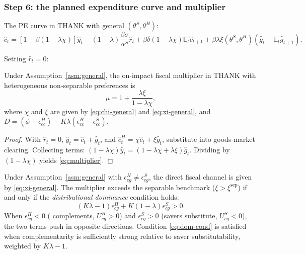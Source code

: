\subsubsection{Step 6: the planned expenditure curve and multiplier}
The PE curve in THANK with general $(\theta^{S},\theta^{H})$:
\begin{equation}\label{eq:PE}
  \hat c_{t}=[1-\beta(1-\lambda\chi)]\hat y_{t}
    -(1-\lambda)\frac{\beta\sigma}{\alpha^{S}}\hat r_{t}
    +\beta\delta(1-\lambda\chi)\mathbb{E}_{t}\hat c_{t+1}
    +\beta\lambda\xi(\theta^{S},\theta^{H})(\hat g_{t}-\mathbb{E}_{t}\hat g_{t+1}).
\end{equation}

Setting $\hat r_{t}=0$:

\begin{proposition}\label{prop:multiplier-general}
Under Assumption~\ref{asm:general}, the on-impact fiscal multiplier in THANK
with heterogeneous non-separable preferences is
\begin{equation}\label{eq:multiplier}
  \mu=1+\frac{\lambda\xi}{1-\lambda\chi},
\end{equation}
where $\chi$ and $\xi$ are given by \eqref{eq:chi-general} and
\eqref{eq:xi-general}, and
$D=(\phi+\epsilon^{H}_{cc})-K\lambda(\epsilon^{H}_{cc}-\epsilon^{S}_{cc})$.
\end{proposition}

\begin{proof}
With $\hat r_{t}=0$, $\hat y_{t}=\hat c_{t}+\hat g_{t}$, and
$\hat c^{H}_{t}=\chi\hat c_{t}+\xi\hat g_{t}$, substitute into goods-market
clearing. Collecting terms: $(1-\lambda\chi)\hat y_{t}=(1-\lambda\chi+\lambda\xi)\hat g_{t}$.
Dividing by $(1-\lambda\chi)$ yields \eqref{eq:multiplier}.
\end{proof}

\begin{corollary}\label{cor:het}
Under Assumption~\ref{asm:general} with
$\epsilon^{H}_{cg}\neq\epsilon^{S}_{cg}$, the direct fiscal channel is given by
\eqref{eq:xi-general}. The multiplier exceeds the separable benchmark
($\xi>\xi^{\mathrm{sep}}$) if and only if the \emph{distributional dominance}
condition holds:
\begin{equation}\label{eq:dom-cond}
  (K\lambda-1)\epsilon^{H}_{cg}+K(1-\lambda)\epsilon^{S}_{cg}>0.
\end{equation}
When $\epsilon^{H}_{cg}<0$ (\HtM{} complements, $U^{H}_{cg}>0$) and
$\epsilon^{S}_{cg}>0$ (savers substitute, $U^{S}_{cg}<0$), the two terms push
in opposite directions. Condition \eqref{eq:dom-cond} is satisfied when \HtM{}
complementarity is sufficiently strong relative to saver substitutability,
weighted by $K\lambda-1$.
\end{corollary}


